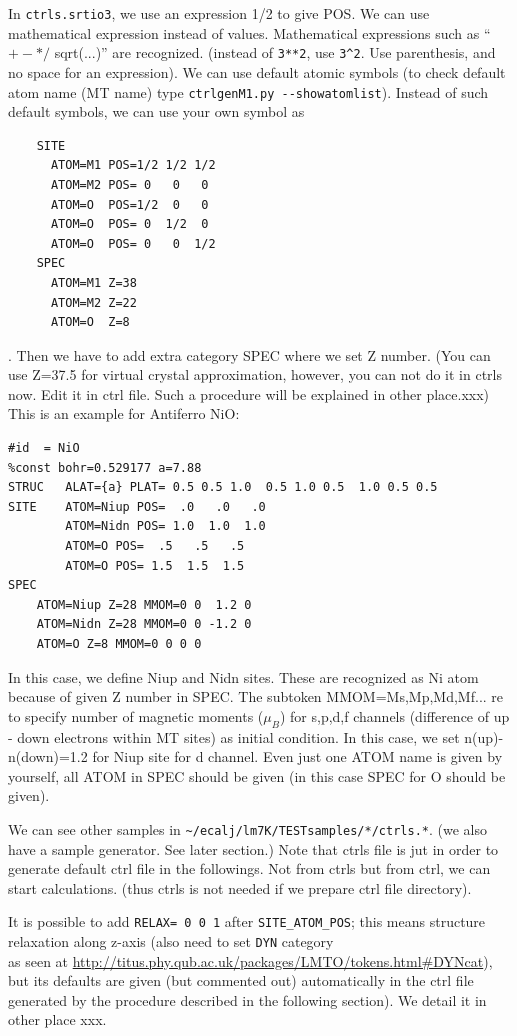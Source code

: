 In \verb+ctrls.srtio3+, we use an expression 1/2 to give POS. 
We can use mathematical expression instead of values.
Mathematical expressions such as ``$+ -  * /$ sqrt(...)'' are recognized.
(instead of \verb+3**2+, use \verb+3^2+. Use parenthesis, and
 no space for an expression).
We can use default atomic symbols (to check default atom name
(MT name) type \verb+ctrlgenM1.py --showatomlist+).
Instead of such default symbols, we can use your own symbol as
\begin{verbatim}
    SITE
      ATOM=M1 POS=1/2 1/2 1/2
      ATOM=M2 POS= 0   0   0
      ATOM=O  POS=1/2  0   0
      ATOM=O  POS= 0  1/2  0
      ATOM=O  POS= 0   0  1/2
    SPEC
      ATOM=M1 Z=38
      ATOM=M2 Z=22
      ATOM=O  Z=8
\end{verbatim}
. Then we have to add extra category SPEC where we set Z number.
(You can use Z=37.5 for virtual crystal approximation, however, 
you can not do it in ctrls now. Edit it in ctrl file. Such a procedure
will be explained in other place.xxx)\\

This is an example for Antiferro NiO:
\begin{verbatim}
#id  = NiO
%const bohr=0.529177 a=7.88
STRUC   ALAT={a} PLAT= 0.5 0.5 1.0  0.5 1.0 0.5  1.0 0.5 0.5
SITE    ATOM=Niup POS=  .0   .0   .0
        ATOM=Nidn POS= 1.0  1.0  1.0
        ATOM=O POS=  .5   .5   .5
        ATOM=O POS= 1.5  1.5  1.5
SPEC
    ATOM=Niup Z=28 MMOM=0 0  1.2 0
    ATOM=Nidn Z=28 MMOM=0 0 -1.2 0
    ATOM=O Z=8 MMOM=0 0 0 0
\end{verbatim}
In this case, we define Niup and Nidn sites. These are recognized as
Ni atom because of given Z number in SPEC. The subtoken MMOM=Ms,Mp,Md,Mf...
re to specify number of magnetic moments ($\mu_B$) for s,p,d,f channels (difference of up -
down electrons within MT sites) as initial condition. In this case, we set n(up)-n(down)=1.2
for Niup site for d channel. Even just one ATOM name is given
by yourself, all ATOM in SPEC should be given (in this case SPEC for O should be given).

We can see other samples in \verb+~/ecalj/lm7K/TESTsamples/*/ctrls.*+.
(we also have a sample generator. See later section.)
Note that ctrls file is jut in order to generate default ctrl file in
the followings. Not from ctrls but from ctrl, we can start calculations.
(thus ctrls is not needed if we prepare ctrl file directory).

It is possible to add \verb+RELAX= 0 0 1+ after \verb+SITE_ATOM_POS+;
this means structure relaxation along z-axis 
(also need to set \verb+DYN+ category \\
as seen at \url{http://titus.phy.qub.ac.uk/packages/LMTO/tokens.html#DYNcat}),
but its defaults are given (but commented out) automatically in the ctrl file
generated by the procedure described in the following section).
We detail it in other place xxx.\\


